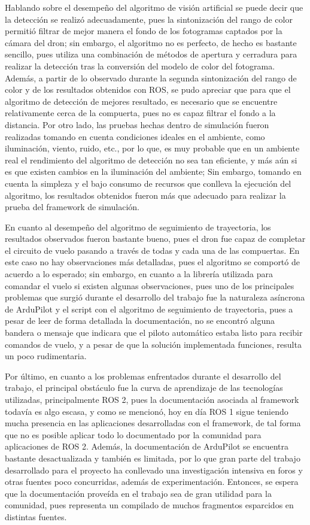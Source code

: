 Hablando sobre el desempeño del algoritmo de visión artificial se puede decir que la detección se realizó adecuadamente, pues la sintonización del rango de color permitió filtrar de mejor manera el fondo de los fotogramas captados por la cámara del dron; sin embargo, el algoritmo no es perfecto, de hecho es bastante sencillo, pues utiliza una combinación de métodos de apertura y cerradura para realizar la detección tras la conversión del modelo de color del fotograma. Además, a partir de lo observado durante la segunda sintonización del rango de color y de los resultados obtenidos con ROS, se pudo apreciar que para que el algoritmo de detección de mejores resultado, es necesario que se encuentre relativamente cerca de la compuerta, pues no es capaz filtrar el fondo a la distancia. Por otro lado, las pruebas hechas dentro de simulación fueron realizadas tomando en cuenta condiciones ideales en el ambiente, como iluminación, viento, ruido, etc., por lo que, es muy probable que en un ambiente real el rendimiento del algoritmo de detección no sea tan eficiente, y más aún si es que existen cambios en la iluminación del ambiente; Sin embargo, tomando en cuenta la simpleza y el bajo consumo de recursos que conlleva la ejecución del algoritmo, los resultados obtenidos fueron más que adecuado para realizar la prueba del framework de simulación. 

En cuanto al desempeño del algoritmo de seguimiento de trayectoria, los resultados observados fueron bastante bueno, pues el dron fue capaz de completar el circuito de vuelo pasando a través de todas y cada una de las compuertas. En este caso no hay observaciones más detalladas, pues el algoritmo se comportó de acuerdo a lo esperado; sin embargo, en cuanto a la librería utilizada para comandar el vuelo si existen algunas observaciones, pues uno de los principales problemas que surgió durante el desarrollo del trabajo fue la naturaleza asíncrona de ArduPilot y el script con el algoritmo de seguimiento de trayectoria, pues a pesar de leer de forma detallada la documentación, no se encontró alguna bandera o mensaje que indicara que el piloto automático estaba listo para recibir comandos de vuelo, y a pesar de que la solución implementada funciones, resulta un poco rudimentaria.

Por último, en cuanto a los problemas enfrentados durante el desarrollo del trabajo, el principal obstáculo fue la curva de aprendizaje de las tecnologías utilizadas, principalmente ROS 2, pues la documentación asociada al framework todavía es algo escasa, y como se mencionó, hoy en día ROS 1 sigue teniendo mucha presencia en las aplicaciones desarrolladas con el framework, de tal forma que no es posible aplicar todo lo documentado por la comunidad para aplicaciones de ROS 2. Además, la documentación de ArduPilot se encuentra bastante desactualizada y también es limitada, por lo que gran parte del trabajo desarrollado para el proyecto ha conllevado una investigación intensiva en foros y otras fuentes poco concurridas, además de experimentación. Entonces, se espera que la documentación proveída en el trabajo sea de gran utilidad para la comunidad, pues representa un compilado de muchos fragmentos esparcidos en distintas fuentes.


